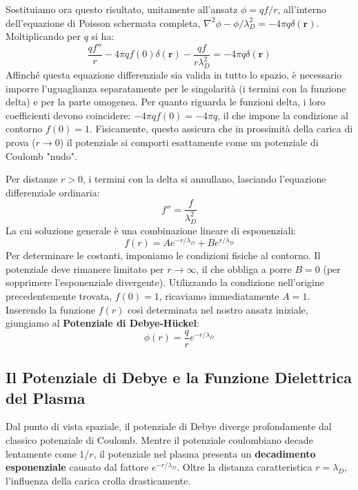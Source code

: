 Sostituiamo ora questo risultato, unitamente all'ansatz $\phi = qf/r$, all'interno dell'equazione di Poisson schermata completa, $\nabla^2\phi - \phi/\lambda_D^2 = -4\pi q \delta(\mathbf{r})$. Moltiplicando per $q$ si ha:
\begin{equation}
\frac{qf''}{r} - 4\pi q f(0) \delta(\mathbf{r}) - \frac{qf}{r\lambda_D^2} = -4\pi q \delta(\mathbf{r})
\end{equation}
Affinché questa equazione differenziale sia valida in tutto lo spazio, è necessario imporre l'uguaglianza separatamente per le singolarità (i termini con la funzione delta) e per la parte omogenea.
Per quanto riguarda le funzioni delta, i loro coefficienti devono coincidere: $-4\pi q f(0) = -4\pi q$, il che impone la condizione al contorno $f(0) = 1$. Fisicamente, questo assicura che in prossimità della carica di prova ($r \to 0$) il potenziale si comporti esattamente come un potenziale di Coulomb "nudo".

Per distanze $r > 0$, i termini con la delta si annullano, lasciando l'equazione differenziale ordinaria:
\begin{equation}
f'' = \frac{f}{\lambda_D^2}
\end{equation}
La cui soluzione generale è una combinazione lineare di esponenziali:
\begin{equation}
f(r) = A e^{-r/\lambda_D} + B e^{r/\lambda_D}
\end{equation}
Per determinare le costanti, imponiamo le condizioni fisiche al contorno. Il potenziale deve rimanere limitato per $r \to \infty$, il che obbliga a porre $B = 0$ (per sopprimere l'esponenziale divergente). Utilizzando la condizione nell'origine precedentemente trovata, $f(0) = 1$, ricaviamo immediatamente $A = 1$.
Inserendo la funzione $f(r)$ così determinata nel nostro ansatz iniziale, giungiamo al \textbf{Potenziale di Debye-Hückel}:
\begin{equation}
\phi(r) = \frac{q}{r} e^{-r/\lambda_D}
\end{equation}

\subsection{Il Potenziale di Debye e la Funzione Dielettrica del Plasma}

Dal punto di vista spaziale, il potenziale di Debye diverge profondamente dal classico potenziale di Coulomb. Mentre il potenziale coulombiano decade lentamente come $1/r$, il potenziale nel plasma presenta un \textbf{decadimento esponenziale} causato dal fattore $e^{-r/\lambda_D}$. Oltre la distanza caratteristica $r = \lambda_D$, l'influenza della carica crolla drasticamente.

